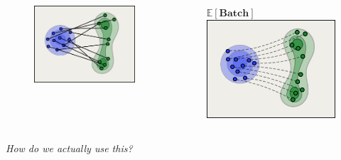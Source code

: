 \documentclass{beamer}
\begin{document}
\begin{frame}
{\begin{columns}
\begin{column}{0.28\linewidth}
\begin{figure}
            \includegraphics[width=\linewidth]{figures/batch-2.png}
        \end{figure}
        \end{column}
        \begin{column}{0.28\linewidth}
        \begin{figure}
            \centering
            \( \mathbb{E}[\textbf{Batch}] \)
            \vskip 2pt
            \includegraphics[width=\linewidth]{figures/avg-interpolation.png}
        \end{figure}
        \end{column}
    \end{columns}
    }
\end{frame}
\begin{frame}
    \begin{center}
        \emph{How do we actually use this?}
    \end{center}
\end{frame}
\end{document}
